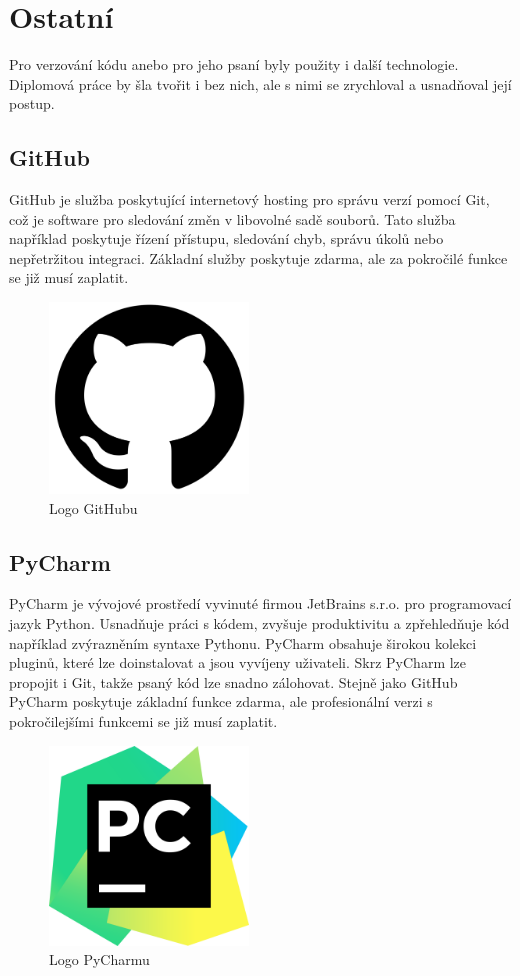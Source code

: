 \section{Ostatní}

Pro verzování kódu anebo pro jeho psaní byly použity i další technologie. Diplomová práce by šla tvořit i bez nich,
ale s nimi se zrychloval a usnadňoval její postup.

\subsection{GitHub}
\label{section-github}

GitHub je služba poskytující internetový hosting pro správu verzí pomocí Git, což je software pro sledování 
změn v libovolné sadě souborů. Tato služba například poskytuje řízení přístupu, sledování chyb, 
správu úkolů nebo nepřetržitou integraci. Základní služby poskytuje zdarma, ale za pokročilé funkce se již musí zaplatit.

\begin{figure}[H] \centering
    \includegraphics[width=150pt]{./pictures/github.png}
    \caption[Logo GitHubu]{Logo GitHubu \cite{github}}
	\label{fig:github}                                
\end{figure} 

\subsection{PyCharm}

PyCharm je vývojové prostředí vyvinuté firmou JetBrains s.r.o. pro programovací jazyk Python.
Usnadňuje práci s kódem, zvyšuje produktivitu a zpřehledňuje kód například zvýrazněním syntaxe Pythonu.
PyCharm obsahuje širokou kolekci plu\-ginů, které lze doinstalovat a jsou vyvíjeny uživateli.
Skrz PyCharm lze propojit i Git, takže psaný kód lze snadno zálohovat. Stejně jako GitHub PyCharm poskytuje 
základní funkce zdarma, ale profesionální verzi s pokročilejšími funkcemi se již musí zaplatit.

\begin{figure}[H] \centering
    \includegraphics[width=150pt]{./pictures/pycharm.png}
    \caption[Logo PyCharmu]{Logo PyCharmu \cite{pycharm}}
	\label{fig:pycharm}                                
\end{figure} 
 